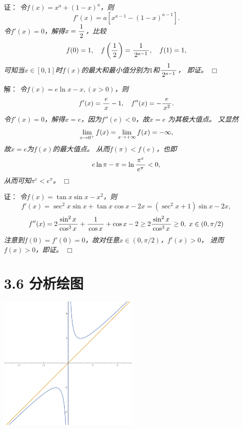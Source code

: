 \begin{frame}
	\linespread{1.5}
	
	\pause
	\small 证：\it 
	令$f(x)=x^a+(1-x)^a$，则
	$$f'(x)=a[x^{a-1}-(1-x)^{a-1}].$$
	令$f'(x)=0$，解得$x=\displaystyle\frac{\,{1}\,}{\,{2}\,}$，比较
	$$f(0)=1,\quad f\left(\displaystyle\frac{\,{1}\,}{\,{2}\,}\right)=\displaystyle\frac{\,{1}\,}{\,{2^{a-1}}\,},
	\quad f(1)=1,$$
	可知当$x\in[0,1]$时$f(x)$的最大和最小值分别为$1$和$\displaystyle\frac{\,{1}\,}{\,{2^{a-1}}\,}$，
	即证。
	\hfill$\Box$
\end{frame}

\begin{frame}
	\linespread{1.5}
	
	\pause
	\small 解：\it 
	令$f(x)=e\ln x-x,(x>0)$，则
	$$f'(x)=\displaystyle\frac{\,{e}\,}{\,{x}\,}-1,\quad f''(x)=-\displaystyle\frac{\,{e}\,}{\,{x^2}\,}.$$
	令$f'(x)=0$，解得$x=e$，因为$f''(e)<0$，故$x=e$
	为其极大值点。
	\pause 又显然
	$$\lim\limits_{x\to{0^+}}f(x)=\lim\limits_{x\to{+\infty}}f(x)=-\infty,$$
	故$x=e$为$f(x)$的最大值点。
	\pause 从而$f(\pi)<f(e)$，也即
	$$e\ln\pi-\pi=\ln\displaystyle\frac{\,{\pi^e}\,}{\,{e^{\pi}}\,}
	<0,$$
	从而可知$\pi^e<e^{\pi}$。
	\hfill$\Box$
\end{frame}

\begin{frame}
	\linespread{1.5}
	
	\pause
	\small 证：\it 
	令$f(x)=\tan x\sin x-x^2$，则
	$$f'(x)=\sec^2x\sin x+\tan x\cos x-2x=(\sec^2x+1)\sin x-2x,$$
	$$f''(x)
	=2\displaystyle\frac{\,{\sin^2x}\,}{\,{\cos^3x}\,}+\displaystyle\frac{\,{1}\,}{\,{\cos x}\,}+\cos x-2
	\geq 2\displaystyle\frac{\,{\sin^2x}\,}{\,{\cos^3x}\,}\geq 0,\;x\in(0,\pi/2)$$
	注意到$f(0)=f'(0)=0$，故对任意$x\in(0,\pi/2)$，$f'(x)>0$，
	进而$f(x)>0$，即证。
	\hfill$\Box$
\end{frame}

\section{3.6 分析绘图}

\begin{frame}
	\linespread{1.5}
	
	\begin{center}
		\includegraphics[width=7cm]{./images/ch3/x1x.pdf}
	\end{center}
\end{frame}

